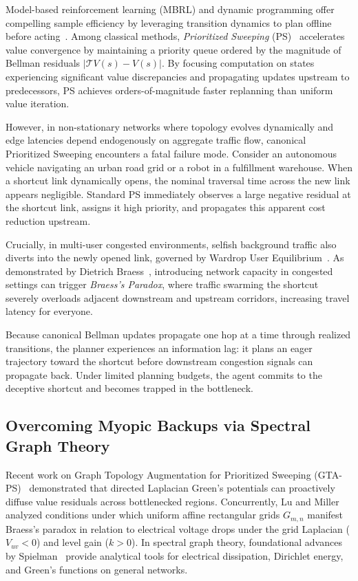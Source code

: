 \documentclass[11pt,a4paper]{article}
\begin{document}
Model-based reinforcement learning (MBRL) and dynamic programming offer compelling sample efficiency by leveraging transition dynamics to plan offline before acting~\cite{sutton2018reinforcement}. Among classical methods, \textit{Prioritized Sweeping} (PS)~\cite{peng1993efficient,moore1993prioritized} accelerates value convergence by maintaining a priority queue ordered by the magnitude of Bellman residuals $|\mathcal{T}V(s) - V(s)|$. By focusing computation on states experiencing significant value discrepancies and propagating updates upstream to predecessors, PS achieves orders-of-magnitude faster replanning than uniform value iteration.

However, in non-stationary networks where topology evolves dynamically and edge latencies depend endogenously on aggregate traffic flow, canonical Prioritized Sweeping encounters a fatal failure mode. Consider an autonomous vehicle navigating an urban road grid or a robot in a fulfillment warehouse. When a shortcut link dynamically opens, the nominal traversal time across the new link appears negligible. Standard PS immediately observes a large negative residual at the shortcut link, assigns it high priority, and propagates this apparent cost reduction upstream. 

Crucially, in multi-user congested environments, selfish background traffic also diverts into the newly opened link, governed by Wardrop User Equilibrium~\cite{wardrop1952road}. As demonstrated by Dietrich Braess~\cite{braess1968paradoxon}, introducing network capacity in congested settings can trigger \textit{Braess's Paradox}, where traffic swarming the shortcut severely overloads adjacent downstream and upstream corridors, increasing travel latency for everyone.

Because canonical Bellman updates propagate one hop at a time through realized transitions, the planner experiences an information lag: it plans an eager trajectory toward the shortcut before downstream congestion signals can propagate back. Under limited planning budgets, the agent commits to the deceptive shortcut and becomes trapped in the bottleneck.

\subsection{Overcoming Myopic Backups via Spectral Graph Theory}
Recent work on Graph Topology Augmentation for Prioritized Sweeping (GTA-PS)~\cite{gta_ps2025} demonstrated that directed Laplacian Green's potentials can proactively diffuse value residuals across bottlenecked regions. Concurrently, Lu and Miller~\cite{lu2026braess} analyzed conditions under which uniform affine rectangular grids $G_{m,n}$ manifest Braess's paradox in relation to electrical voltage drops under the grid Laplacian ($V_{uv} < 0$) and level gain ($k > 0$). In spectral graph theory, foundational advances by Spielman~\cite{spielman2025sagt} provide analytical tools for electrical dissipation, Dirichlet energy, and Green's functions on general networks.
\end{document}
